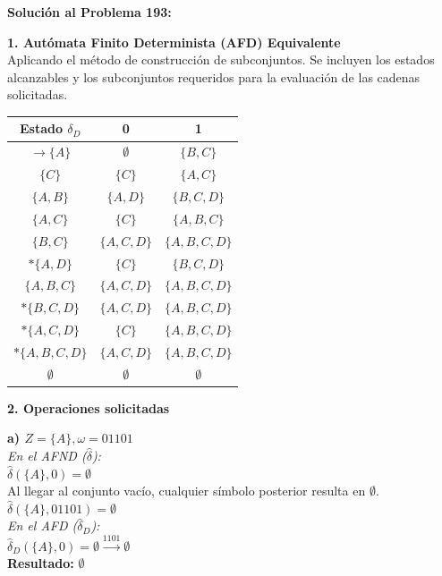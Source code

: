 \documentclass[12pt]{article}
\begin{document}
\begin{center}
\begin{minipage}{0.45\textwidth}
\textbf{Solución al Problema 193:}

\vspace{0.3cm}
\textbf{1. Autómata Finito Determinista (AFD) Equivalente} \\
Aplicando el método de construcción de subconjuntos. Se incluyen los estados alcanzables y los subconjuntos requeridos para la evaluación de las cadenas solicitadas.
\begin{center}
    \begin{tabular}{c|cc}
        Estado $\delta_D$ & 0 & 1 \\
        \hline
        $\rightarrow \{A\}$ & $\emptyset$ & $\{B, C\}$ \\
        $\{C\}$ & $\{C\}$ & $\{A, C\}$ \\
        $\{A, B\}$ & $\{A, D\}$ & $\{B, C, D\}$ \\
        $\{A, C\}$ & $\{C\}$ & $\{A, B, C\}$ \\
        $\{B, C\}$ & $\{A, C, D\}$ & $\{A, B, C, D\}$ \\
        $*\{A, D\}$ & $\{C\}$ & $\{B, C, D\}$ \\
        $\{A, B, C\}$ & $\{A, C, D\}$ & $\{A, B, C, D\}$ \\
        $*\{B, C, D\}$ & $\{A, C, D\}$ & $\{A, B, C, D\}$ \\
        $*\{A, C, D\}$ & $\{C\}$ & $\{A, B, C, D\}$ \\
        $*\{A, B, C, D\}$ & $\{A, C, D\}$ & $\{A, B, C, D\}$ \\
        $\emptyset$ & $\emptyset$ & $\emptyset$ \\
    \end{tabular}
\end{center}
\vspace{0.3cm}
\textbf{2. Operaciones solicitadas}

\vspace{0.2cm}
\textbf{a) $Z = \{A\}, \omega = 01101$} \\
\textit{En el AFND ($\hat{\delta}$):} \\
$\hat{\delta}(\{A\}, 0) = \emptyset$ \\
Al llegar al conjunto vacío, cualquier símbolo posterior resulta en $\emptyset$. \\
$\hat{\delta}(\{A\}, 01101) = \emptyset$ \\
\textit{En el AFD ($\hat{\delta}_D$):} \\
$\hat{\delta}_D(\{A\}, 0) = \emptyset \xrightarrow{1101} \emptyset$ \\
\textbf{Resultado:} $\emptyset$




\end{minipage}
\end{center}
\end{document}
